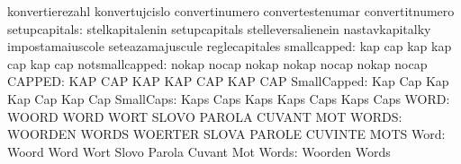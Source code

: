                                   konvertierezahl                  konvertujcislo
                                  convertinumero                   convertestenumar
                                  convertitnumero
                   setupcapitals: stelkapitalenin                  setupcapitals
                                  stelleversalienein               nastavkapitalky
                                  impostamaiuscole                 seteazamajuscule
                                  reglecapitales
                     smallcapped: kap                              cap
                                  kap                              kap
                                  cap                              kap
                                  cap
                  notsmallcapped: nokap                            nocap
                                  nokap                            nokap
                                  nocap                            nokap
                                  nocap
                          CAPPED: KAP                              CAP
                                  KAP                              KAP
                                  CAP                              KAP
                                  CAP
                     SmallCapped: Kap                              Cap
                                  Kap                              Kap
                                  Cap                              Kap
                                  Cap
                       SmallCaps: Kaps                             Caps
                                  Kaps                             Kaps
                                  Caps                             Kaps
                                  Caps
                            WORD: WOORD                            WORD
                                  WORT                             SLOVO
                                  PAROLA                           CUVANT
                                  MOT
                           WORDS: WOORDEN                          WORDS
                                  WOERTER                          SLOVA
                                  PAROLE                           CUVINTE
                                  MOTS
                            Word: Woord                            Word
                                  Wort                             Slovo
                                  Parola                           Cuvant
                                  Mot
                           Words: Woorden                          Words
